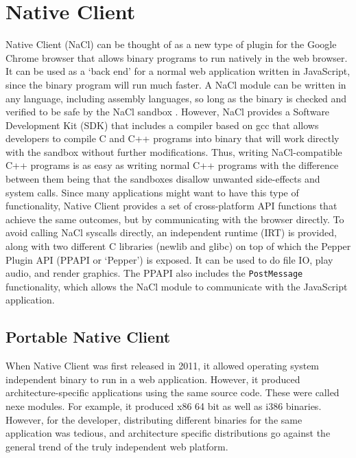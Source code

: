 \section{Native Client} %
\label{sec:native_client_intro}

Native Client (NaCl) can be thought of as a new type of plugin for the Google Chrome browser that allows binary programs to run natively in the web browser. It can be used as a `back end' for a normal web application written in JavaScript, since the binary program will run much faster. A NaCl module can be written in any language, including assembly languages, so long as the binary is checked and verified to be safe by the NaCl sandbox \cite{nacl}. However, NaCl provides a Software Development Kit (SDK) that includes a compiler based on gcc that allows developers to compile C and C++ programs into binary that will work directly with the sandbox without further modifications. Thus, writing NaCl-compatible C++ programs is as easy as writing normal C++ programs with the difference between them being that the sandboxes disallow unwanted side-effects and system calls. Since many applications might want to have this type of functionality, Native Client provides a set of cross-platform API functions that achieve the same outcomes, but by communicating with the browser directly. To avoid calling NaCl syscalls directly, an independent runtime (IRT) is provided, along with two different C libraries (newlib and glibc) on top of which the Pepper Plugin API (PPAPI or `Pepper') is exposed. It can be used to do file IO, play audio, and render graphics. The PPAPI also includes the \lstinline+PostMessage+ functionality, which allows the NaCl module to communicate with the JavaScript application.

\subsection{Portable Native Client} %
\label{sub:portable_native_client}
When Native Client was first released in 2011, it allowed operating system independent binary to run in a web application. However, it produced architecture-specific applications using the same source code. These were called nexe modules. For example, it produced x86 64 bit as well as i386 binaries. However, for the developer, distributing different binaries for the same application was tedious, and architecture specific distributions go against the general trend of the truly independent web platform.

